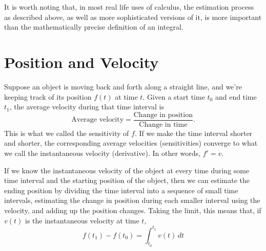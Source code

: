 \documentclass{math-deane}
\begin{document}
It is worth noting that, in most real life uses of calculus, the estimation process as described above, as well as more sophisticated versions of it, is more important than the mathematically precise definition of an integral.

\section{Position and Velocity}

Suppose an object is moving back and forth along a straight line, and we're keeping track of its position $f(t)$ at time $t$. Given a start time $t_0$ and end time $t_1$, the average velocity during that time interval is
\[
\text{Average velocity} = \frac{\text{Change in position}}{\text{Change in time}}.
\]
This is what we called the sensitivity of $f$. If we make the time interval shorter and shorter, the corresponding average velocities (sensitivities) converge to what we call the instantaneous velocity (derivative). In other words, $f' = v$.

If we know the instantaneous velocity of the object at every time during some time interval and the starting position of the object, then we can estimate the ending position by dividing the time interval into a sequence of small time intervals, estimating the change in position during each smaller interval using the velocity, and adding up the position changes. Taking the limit, this means that, if $v(t)$ is the instantaneous velocity at time $t$, 
\[
f(t_1) - f(t_0) = \int_{t_0}^{t_1} v(t)\,dt
\]
\end{document}
